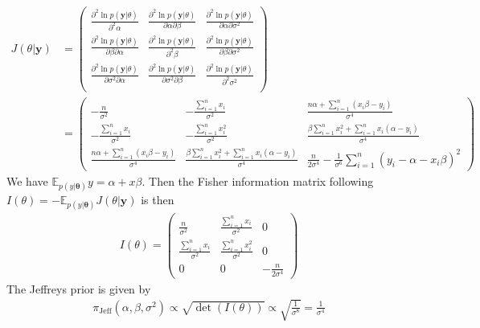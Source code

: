 \begin{align*}
    J(\theta \vert \bm{y}) 
    &=\begin{pmatrix}
        \frac{\partial^2 \ln p(\bm{y} \vert \theta)}{\partial^2 \alpha} &
        \frac{\partial^2 \ln p(\bm{y} \vert \theta)}{\partial \alpha \partial \beta} &
        \frac{\partial^2 \ln p(\bm{y} \vert \theta)}{\partial \alpha \partial \sigma^2} \\
        \frac{\partial^2 \ln p(\bm{y} \vert \theta)}{\partial \beta \partial \alpha} &
        \frac{\partial^2 \ln p(\bm{y} \vert \theta)}{\partial^2 \beta} &
        \frac{\partial^2 \ln p(\bm{y} \vert \theta)}{\partial \beta \partial \sigma^2} \\
        \frac{\partial^2 \ln p(\bm{y} \vert \theta)}{\partial \sigma^2 \partial \alpha} &
        \frac{\partial^2 \ln p(\bm{y} \vert \theta)}{\partial \sigma^2 \partial \beta} &
        \frac{\partial^2 \ln p(\bm{y} \vert \theta)}{\partial^2 \sigma^2} \\
    \end{pmatrix}\\
    &=
    \begin{pmatrix}
        -\frac{n}{\sigma^2} & -\frac{\sum_{i=1}^n x_i}{\sigma^2} & \frac{n\alpha + \sum_{i=1}^n (x_i\beta - y_i)}{\sigma^4}\\
        -\frac{\sum_{i=1}^n x_i}{\sigma^2} & -\frac{\sum_{i=1}^n x_i^2}{\sigma^2} & \frac{\beta\sum_{i=1}^n x_i^2 + \sum_{i=1}^n x_i(\alpha - y_i)} {\sigma^4}\\
        \frac{n\alpha + \sum_{i=1}^n (x_i\beta - y_i)}{\sigma^4} & \frac{\beta\sum_{i=1}^n x_i^2 + \sum_{i=1}^n x_i(\alpha - y_i)} {\sigma^4} &
        \frac{n}{2\sigma^4} - \frac{1}{\sigma^6} \sum_{i=1}^n (y_i - \alpha - x_i\beta)^2
    \end{pmatrix}
\end{align*}
We have $\mathbb{E}_{p(y \vert \bm{\theta})} y = \alpha + x\beta$. Then the Fisher information matrix following $I(\theta) = 
-\mathbb{E}_{p(y \vert \bm{\theta})} J(\theta \vert \bm{y}) $ is then
\begin{align*}
    I(\theta) = 
        \begin{pmatrix}
        \frac{n}{\sigma^2} & \frac{\sum_{i=1}^n x_i}{\sigma^2} & 0\\
        \frac{\sum_{i=1}^n x_i}{\sigma^2} & \frac{\sum_{i=1}^n x_i^2}{\sigma^2} & 0 \\
        0 & 0 & -\frac{n}{2\sigma^4}
    \end{pmatrix}
\end{align*}
The Jeffreys prior is given by 
\begin{align*}
    \pi_{\mathrm{Jeff}}(\alpha, \beta, \sigma^2) \propto \sqrt{\det (I(\theta))} \propto \sqrt{ \frac{1}{\sigma^8} }= \frac{1}{\sigma^4}
\end{align*}

